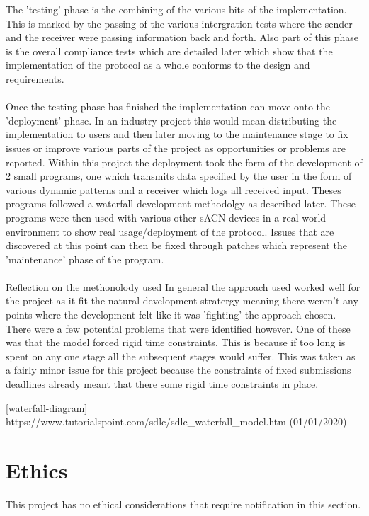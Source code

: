 \documentclass[11pt,a4paper]{report}
\begin{document}
	The 'testing' phase is the combining of the various bits of the implementation. This is marked by the passing of the various intergration tests
	where the sender and the receiver were passing information back and forth. Also part of this phase is the overall compliance tests which are detailed
	later which show that the implementation of the protocol as a whole conforms to the design and requirements.

	\paragraph*{}
	Once the testing phase has finished the implementation can move onto the 'deployment' phase. In an industry project this would mean 
	distributing the implementation to users and then later moving to the maintenance stage to fix issues or improve various parts of the project
	as opportunities or problems are reported. Within this project the deployment took the form of the development of 2 small programs, one which transmits data 
	specified by the user in the form of various dynamic patterns and a receiver which logs all received input. Theses programs followed a waterfall development
	methodolgy as described later. These programs were then used with various other sACN devices in a real-world environment to show real usage/deployment of
	the protocol. Issues that are discovered at this point can then be fixed through patches which represent the 'maintenance' phase of the program.
	
	\paragraph*{}
	Reflection on the methonolody used
	In general the approach used worked well for the project as it fit the natural development stratergy meaning there weren't any points where the development felt
	like it was 'fighting' the approach chosen. There were a few potential problems that were identified however. One of these was that the model forced rigid time 
	constraints. This is because if too long is spent on any one stage all the subsequent stages would suffer. This was taken as a fairly minor issue for this project 
	because the constraints of fixed submissions deadlines already meant that there some rigid time constraints in place. 

	\ref{waterfall-diagram}
	https://www.tutorialspoint.com/sdlc/sdlc\_waterfall\_model.htm (01/01/2020)
	
	\section*{Ethics}
	This project has no ethical considerations that require notification in this section.
	
\end{document}
